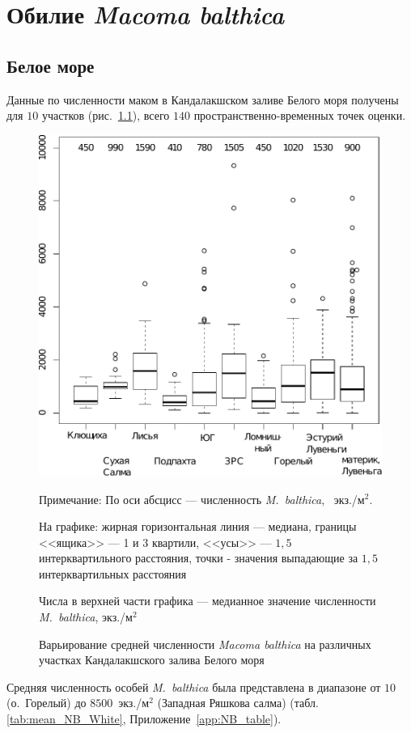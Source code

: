 	\chapter{Обилие {\it Macoma balthica}}
	\section{Белое море}
Данные по численности маком в Кандалакшском заливе Белого моря получены для $10$ участков (рис.~\ref{ris:N_area_White}), всего $140$ пространственно-временных точек оценки.
	\begin{figure}[p]
	\begin{center}
		\includegraphics[height=0.5\textheight]{../All_N/N2_area_White1.pdf}
	\end{center}
	\caption{Варьирование средней численности {\it Macoma balthica} на различных участках Кандалакшского залива Белого моря}
	{\footnotesize Примечание: По оси абсцисс --- численность {\it M.~balthica}, ~экз./м$^2$.

	На графике: жирная горизонтальная линия --- медиана, границы <<ящика>> --- 1 и 3 квартили, <<усы>> --- $1,5$ интерквартильного расстояния, точки - значения выпадающие за $1,5$ интерквартильных расстояния

Числа в верхней части графика --- медианное значение численности {\it M.~balthica}, экз./м$^2$}
	\label{ris:N_area_White}
	\end{figure}
Средняя численность особей {\it M.~balthica} была представлена в диапазоне от $10$ (о.~Горелый) до $8500$~экз./м$^2$ (Западная Ряшкова салма) (табл. \ref{tab:mean_NB_White}, Приложение~\ref{app:NB_table}).

